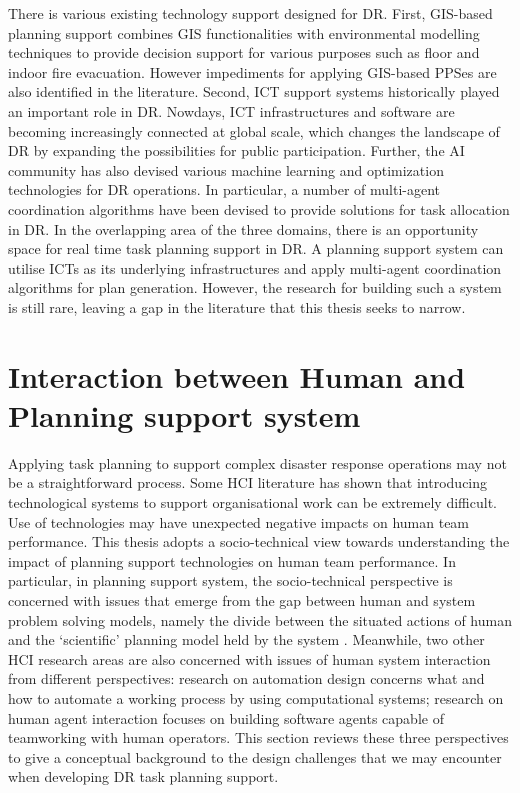 There is various existing technology support designed for \ac{DR}. First, \ac{GIS}-based planning support combines \ac{GIS} functionalities with environmental modelling techniques to provide decision support for various purposes such as floor and indoor fire evacuation. However impediments for applying \ac{GIS}-based \ac{PPS}es are also identified in the literature. Second, \ac{ICT} support systems historically played an important role in \ac{DR}. Nowdays, \ac{ICT} infrastructures and software are becoming increasingly connected at global scale, which changes the landscape of \ac{DR} by expanding the possibilities for public participation. Further, the \ac{AI} community has also devised various machine learning and optimization technologies for \ac{DR} operations. In particular, a number of multi-agent coordination algorithms have been devised to provide solutions for task allocation in \ac{DR}. In the overlapping area of the three domains, there is an opportunity space for real time task planning support in \ac{DR}. A planning support system can utilise \ac{ICT}s as its underlying infrastructures and apply multi-agent coordination algorithms for plan generation. However, the research for building such a system is still rare, leaving a gap in the literature that this thesis seeks to narrow.\\

\chapter{Interaction between Human and Planning support system}\label{ch:humanSysRelationship}

Applying task planning to support complex disaster response operations may not be a straightforward process. Some \ac{HCI} literature \citep{Ackerman2000,Bowers1994,Niazkhani2009} has shown that introducing technological systems to support organisational work can be extremely difficult. Use of technologies may have unexpected negative impacts on human team performance. This thesis adopts a socio-technical view towards understanding the impact of planning support technologies on human team performance. In particular, in planning support system, the socio-technical perspective is concerned with issues that emerge from the gap between human and system problem solving models, namely the divide between the situated actions of human and the `scientific' planning model held by the system \citep{Suchman1987}. Meanwhile, two other \ac{HCI} research areas are also concerned with issues of human system interaction from different perspectives: research on automation design concerns what and how to automate a working process by using computational systems; research on human agent interaction focuses on building software agents capable of teamworking with human operators. This section reviews these three perspectives to give a conceptual background to the design challenges that we may encounter when developing \ac{DR} task planning support.\\


